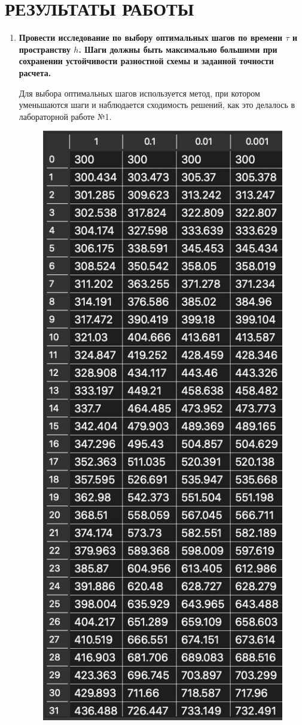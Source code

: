 \section{РЕЗУЛЬТАТЫ РАБОТЫ}

\begin{enumerate}
    \item \textbf{Провести исследование по выбору оптимальных шагов по времени $\tau$ и пространству $h$. Шаги должны быть максимально большими при сохранении устойчивости разностной схемы и заданной точности расчета.}

        Для выбора оптимальных шагов используется метод, при котором уменьшаются шаги и наблюдается сходимость решений, как это делалось в лабораторной работе №1.

        \begin{figure}[H]
            \centering
            \includegraphics[scale=0.6]{img/steph.png}

\end{figure}
\end{enumerate}
